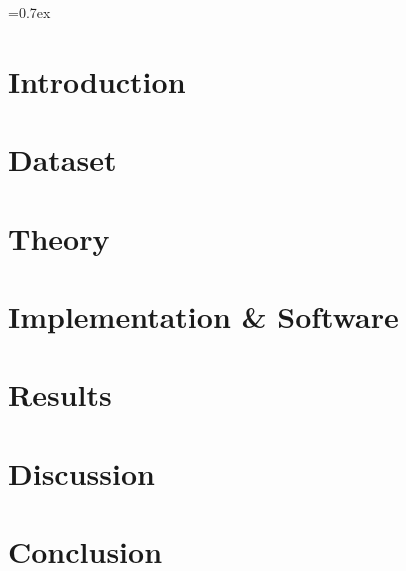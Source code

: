 


	
	\font=0.7ex%

	
	\thispagestyle{empty}
	\tableofcontents
	\thispagestyle{empty}
	
	\pagestyle{fancy}
	\fancyhf{}
	\cfoot{\thepage}
	
	\newpage	
	\section{Introduction}
	
	
	\section{Dataset}\label{sec:dataset}
	
	
	\section{Theory}\label{sec:theory}
	
	
	\section{Implementation \& Software}					\label{sec:implementation_software}
	
	
	\section{Results}\label{sec:results}
	
	
	\section{Discussion}\label{sec:discussion}
	
	
	\section{Conclusion}\label{sec:conclusion_outlook}
	

	\newpage
	\printbibliography
	
